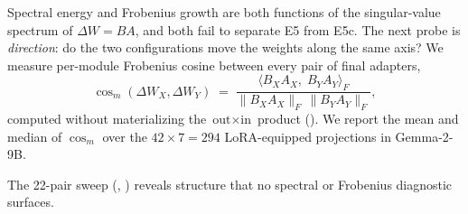 \documentclass[11pt]{article}
\begin{document}
Spectral energy and Frobenius growth are both functions of the singular-value spectrum of $\Delta W{=}BA$, and both fail to separate E5 from E5c. The next probe is \emph{direction}: do the two configurations move the weights along the same axis? We measure per-module Frobenius cosine between every pair of final adapters,
\begin{equation}
\cos_m(\Delta W_X, \Delta W_Y) \;=\; \frac{\langle B_X A_X,\; B_Y A_Y\rangle_F}{\|B_X A_X\|_F\,\|B_Y A_Y\|_F},
\label{eq:cosine}
\end{equation}
computed without materializing the $\text{out}\times\text{in}$ product (). We report the mean and median of $\cos_m$ over the $42\times 7 = 294$ LoRA-equipped projections in Gemma-2-9B.

The 22-pair sweep (, ) reveals structure that no spectral or Frobenius diagnostic surfaces.
\end{document}
